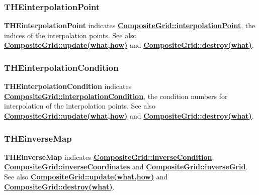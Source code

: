\documentclass{article}
\begin{document}
  \subsubsection{THEinterpolationPoint}
  \label{CompositeGrid::THEinterpolationPoint}
    \textbf{THEinterpolationPoint} indicates {\bf{}\hyperref{interpolationPoint}{interpolationPoint \rm(\S}{)}{CompositeGrid::interpolationPoint}},
    the indices of the interpolation points.
    See also {\bf{}\hyperref{update(what,how)}{update(what,how) \rm(\S}{)}{CompositeGrid::update(what,how)}}
    and {\bf{}\hyperref{destroy(what)}{destroy(what) \rm(\S}{)}{CompositeGrid::destroy(what)}}.

  \subsubsection{THEinterpolationCondition}
  \label{CompositeGrid::THEinterpolationCondition}
    \textbf{THEinterpolationCondition} indicates
    {\bf{}\hyperref{interpolationCondition}{interpolationCondition \rm(\S}{)}{CompositeGrid::interpolationCondition}},
    the condition numbers for interpolation of the interpolation points.
    See also {\bf{}\hyperref{update(what,how)}{update(what,how) \rm(\S}{)}{CompositeGrid::update(what,how)}}
    and {\bf{}\hyperref{destroy(what)}{destroy(what) \rm(\S}{)}{CompositeGrid::destroy(what)}}.

  \subsubsection{THEinverseMap}
  \label{CompositeGrid::THEinverseMap}
    \textbf{THEinverseMap} indicates
    {\bf{}\hyperref{inverseCondition}{inverseCondition \rm(\S}{)}{CompositeGrid::inverseCondition}},
    {\bf{}\hyperref{inverseCoordinates}{inverseCoordinates \rm(\S}{)}{CompositeGrid::inverseCoordinates}} and
    {\bf{}\hyperref{inverseGrid}{inverseGrid \rm(\S}{)}{CompositeGrid::inverseGrid}}.
    See also {\bf{}\hyperref{update(what,how)}{update(what,how) \rm(\S}{)}{CompositeGrid::update(what,how)}}
    and {\bf{}\hyperref{destroy(what)}{destroy(what) \rm(\S}{)}{CompositeGrid::destroy(what)}}.
\end{document}
